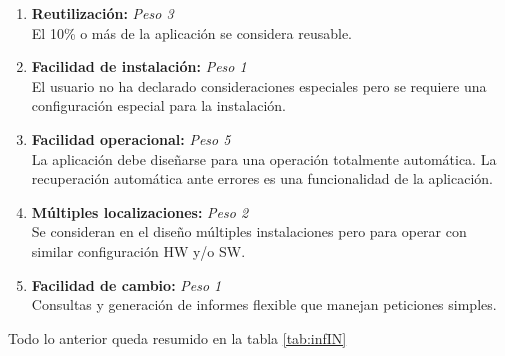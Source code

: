 \documentclass[11pt,a4paper,spanish,twoside]{book}
\begin{document}
\begin{enumerate}[{\bf 1.}]
\item {\bf Reutilización:} \emph{Peso 3} \\ El 10\% o más de la aplicación se
  considera reusable. 

\item {\bf Facilidad de instalación:} \emph{Peso 1} \\ El usuario no ha
  declarado consideraciones especiales pero se requiere una configuración
  especial para la instalación.

\item {\bf Facilidad operacional:} \emph{Peso 5} \\ La aplicación debe diseñarse
  para una operación totalmente automática. La recuperación automática ante
  errores es una funcionalidad de la aplicación. 

\item {\bf Múltiples localizaciones:} \emph{Peso 2} \\ Se consideran en el
  diseño múltiples instalaciones pero para operar con similar configuración
  HW y/o SW. 

\item {\bf Facilidad de cambio:} \emph{Peso 1} \\ Consultas y generación de
  informes flexible que manejan peticiones simples.
\end{enumerate}

Todo lo anterior queda resumido en la tabla \ref{tab:infIN}
\end{document}
